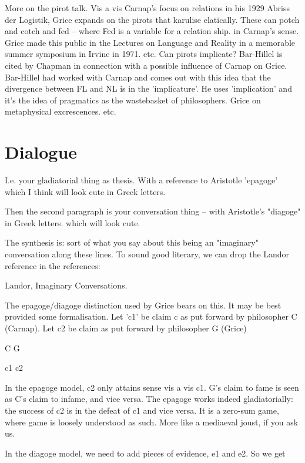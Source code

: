 \documentclass[10pt,titlepage]{book}
\begin{document}
More  on the pirot talk. Vis a vis Carnap’s focus on relations in his 1929  
Abriss der Logistik, Grice expands on the pirots that karulise elatically. 
These  can potch and cotch and fed – where Fed is a variable for a relation 
ship. in  Carnap's sense. Grice made this public in the Lectures on Language 
and Reality  in a  memorable summer symposium in Irvine in 1971. etc. 
Can  pirots implicate? Bar-Hillel  is cited by Chapman in connection with a 
possible influence of Carnap on Grice.  Bar-Hillel had worked with Carnap 
and comes out with this idea that the  divergence between FL and NL is in the 
'implicature'. He uses 'implication' and  it's the idea of pragmatics as 
the wastebasket of philosophers. Grice on  metaphysical excrescences. etc.

\section{Dialogue}

I.e. your gladiatorial thing as thesis. With a reference to Aristotle  
'epagoge' which I think will look cute in Greek letters.
 
Then the second paragraph is your conversation thing -- with Aristotle's  
"diagoge" in Greek letters. which will look cute.
 
The synthesis is: sort of what you say about this being an "imaginary"  
conversation along these lines. To sound good literary, we can drop the Landor  
reference in the references:
 
   Landor, Imaginary Conversations.
 
 The epagoge/diagoge distinction used by Grice bears on this. It may be best 
 provided some formalisation. Let 'c1' be claim c as put forward by 
philosopher C  (Carnap). Let c2 be claim as put forward by philosopher G (Grice)
 
                  C                         G
 
                  c1                        c2
 
In the epagoge model, c2 only attains sense vis a vis c1. G's claim to fame 
 is seen as C's claim to infame, and vice versa. The epagoge works indeed  
gladiatorially: the success of c2 is in the defeat of c1 and vice versa. It 
is a  zero-sum game, where game is loosely understood as such. More like a 
mediaeval  joust, if you ask us.
 
In the diagoge model, we need to add pieces of evidence, e1 and e2. So we  
get
 
\end{document}
